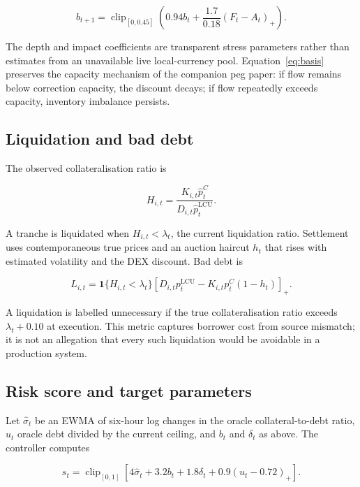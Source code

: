 \documentclass[sn-vancouver,Numbered]{sn-jnl}
\newcommand{\lcu}{\mathrm{LCU}}
\newcommand{\clip}{\operatorname{clip}}
\begin{document}
\begin{equation}
 b_{t+1}=\clip_{[0,0.45]}
 \left(0.94b_t+\frac{1.7}{0.18}(F_t-A_t)_+\right).
 \label{eq:basis}
\end{equation}

The depth and impact coefficients are transparent stress parameters rather than estimates from an unavailable live local-currency pool. Equation~\eqref{eq:basis} preserves the capacity mechanism of the companion peg paper: if flow remains below correction capacity, the discount decays; if flow repeatedly exceeds capacity, inventory imbalance persists.

\subsection{Liquidation and bad debt}

The observed collateralisation ratio is

\begin{equation}
 H_{i,t}=\frac{K_{i,t}\widehat p_t^C}{D_{i,t}\widehat p_t^{\lcu}}.
 \label{eq:health}
\end{equation}

A tranche is liquidated when $H_{i,t}<\lambda_t$, the current liquidation ratio. Settlement uses contemporaneous true prices and an auction haircut $h_t$ that rises with estimated volatility and the DEX discount. Bad debt is

\begin{equation}
 L_{i,t}=\mathbf{1}\{H_{i,t}<\lambda_t\}
 \left[D_{i,t}p_t^{\lcu}-K_{i,t}p_t^C(1-h_t)\right]_+.
 \label{eq:loss}
\end{equation}

A liquidation is labelled unnecessary if the true collateralisation ratio exceeds $\lambda_t+0.10$ at execution. This metric captures borrower cost from source mismatch; it is not an allegation that every such liquidation would be avoidable in a production system.

\subsection{Risk score and target parameters}

Let $\widehat\sigma_t$ be an EWMA of six-hour log changes in the oracle collateral-to-debt ratio, $u_t$ oracle debt divided by the current ceiling, and $b_t$ and $\delta_t$ as above. The controller computes

\begin{equation}
 s_t=\clip_{[0,1]}\left[
 4\widehat\sigma_t+3.2b_t+1.8\delta_t+0.9(u_t-0.72)_+
 \right].
 \label{eq:risk-score}
\end{equation}
\end{document}

